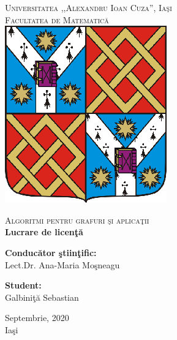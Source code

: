 

\begin{titlepage}
	\begin{center}
		\large
		\textsc{Universitatea ,\hspace{-0.02cm},Alexandru Ioan Cuza'', Ia\c si}\\
		\textsc{Facultatea de Matematic\u{a}}\\[0.3cm]
 		\includegraphics[scale=.4]{stema.eps}
		\vfill
		
		\Huge
		\textsc{Algoritmi pentru grafuri \c si aplica\c{t}ii}\\[0.8cm]
		\large
		\textbf{Lucrare de licen\c t\u a}
		
		\vfill
		\begin{minipage}[t]{0.49\textwidth}
			\begin{flushleft}
				\large
				\textbf{Conduc\u{a}tor \c{s}tiin\c{t}ific:}\\
				Lect.Dr. Ana-Maria Mo\c{s}neagu
			\end{flushleft}
		\end{minipage}
	    \hfill
	    \begin{minipage}[t]{0.49\textwidth}
	    	\begin{flushright}
	    		\large
	    		\textbf{Student:}\\
	    		Galbini\c t\u a Sebastian
	    	\end{flushright}
    	\end{minipage}
	    
	    \vfill
	    \large
	    \centering
	    Septembrie, 2020\\
	    Ia\c{s}i
	\end{center}
\end{titlepage}

